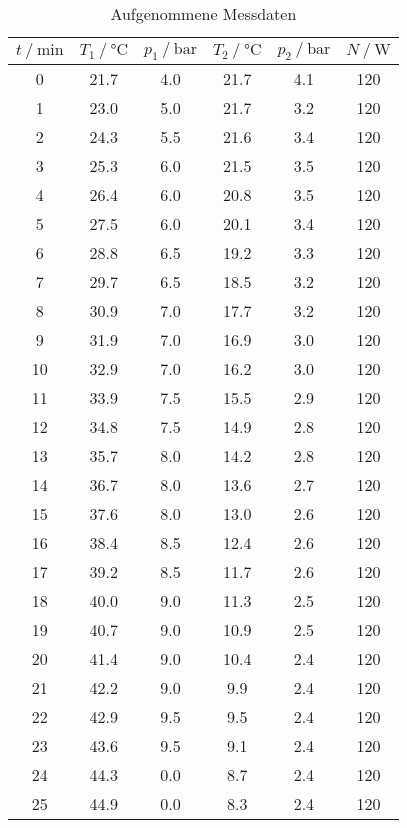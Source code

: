 \begin{table}[H]
\centering
\caption{Aufgenommene Messdaten}
\label{tab:Messdaten}
\begin{tabular}{c c c c c c}
\toprule
$t \mathbin{/} \si{\minute}$ &
$T_1 \mathbin{/} \si{\celsius}$ &
$p_1 \mathbin{/} \si{\bar}$ &
$T_2 \mathbin{/} \si{\celsius}$ &
$p_2 \mathbin{/} \si{\bar}$ &
$N \mathbin{/} \si{\watt}$ \\
\midrule
%
0	 & 21.7 & 4.0  & 21.7 & 4.1 & 120 \\
1  & 23.0 & 5.0  & 21.7 & 3.2	& 120 \\
2  & 24.3 & 5.5  & 21.6 & 3.4	& 120 \\
3  & 25.3 & 6.0  & 21.5 & 3.5	& 120 \\
4  & 26.4 & 6.0  & 20.8 & 3.5	& 120 \\
5  & 27.5 & 6.0  & 20.1 & 3.4	& 120 \\
6  & 28.8 & 6.5  & 19.2 & 3.3	& 120 \\
7  & 29.7 & 6.5  & 18.5 & 3.2	& 120 \\
8  & 30.9 & 7.0  & 17.7 & 3.2	& 120 \\
9  & 31.9 & 7.0  & 16.9 & 3.0	& 120 \\
10 & 32.9 & 7.0  & 16.2 & 3.0	& 120 \\
11 & 33.9 & 7.5  & 15.5 & 2.9	& 120 \\
12 & 34.8 & 7.5  & 14.9 & 2.8	& 120 \\
13 & 35.7 & 8.0  & 14.2 & 2.8	& 120 \\
14 & 36.7 & 8.0  & 13.6 & 2.7	& 120 \\
15 & 37.6 & 8.0  & 13.0 & 2.6	& 120 \\
16 & 38.4 & 8.5  & 12.4 & 2.6	& 120 \\
17 & 39.2 & 8.5  & 11.7 & 2.6	& 120 \\
18 & 40.0 & 9.0  & 11.3 & 2.5	& 120 \\
19 & 40.7 & 9.0  & 10.9 & 2.5	& 120 \\
20 & 41.4 & 9.0  & 10.4 & 2.4	& 120 \\
21 & 42.2 & 9.0  & 9.9  & 2.4	& 120 \\
22 & 42.9 & 9.5  & 9.5  & 2.4	& 120 \\
23 & 43.6 & 9.5  & 9.1  & 2.4	& 120 \\
24 & 44.3 & 0.0	 & 8.7  & 2.4	& 120 \\
25 & 44.9 & 0.0	 & 8.3  & 2.4	& 120 \\

\end{tabular}
\end{table}
